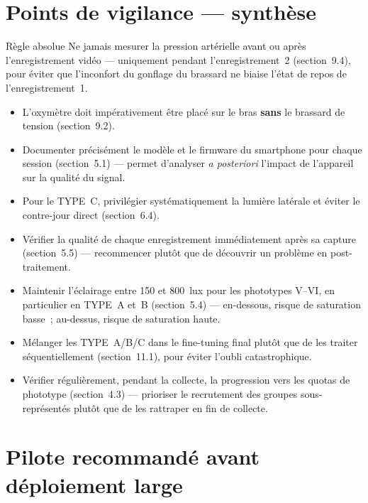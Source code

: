 \documentclass[11pt,a4paper]{article}
\begin{document}
\newpage
\section{Points de vigilance --- synth\`ese}

\begin{warnbox}{R\`egle absolue}
Ne jamais mesurer la pression art\'erielle avant ou apr\`es l'enregistrement
vid\'eo --- uniquement pendant l'enregistrement~2 (section~9.4), pour
\'eviter que l'inconfort du gonflage du brassard ne biaise l'\'etat de repos
de l'enregistrement~1.
\end{warnbox}

\begin{itemize}
\item L'oxym\`etre doit imp\'erativement \^etre plac\'e sur le bras
\textbf{sans} le brassard de tension (section~9.2).
\item Documenter pr\'ecis\'ement le mod\`ele et le firmware du smartphone
pour chaque session (section~5.1) --- permet d'analyser \emph{a posteriori}
l'impact de l'appareil sur la qualit\'e du signal.
\item Pour le TYPE~C, privil\'egier syst\'ematiquement la lumi\`ere
lat\'erale et \'eviter le contre-jour direct (section~6.4).
\item V\'erifier la qualit\'e de chaque enregistrement imm\'ediatement
apr\`es sa capture (section~5.5) --- recommencer plut\^ot que de
d\'ecouvrir un probl\`eme en post-traitement.
\item Maintenir l'\'eclairage entre 150 et 800~lux pour les phototypes
V--VI, en particulier en TYPE~A et~B (section~5.4) --- en-dessous, risque de
saturation basse~; au-dessus, risque de saturation haute.
\item M\'elanger les TYPE~A/B/C dans le fine-tuning final plut\^ot que de
les traiter s\'equentiellement (section~11.1), pour \'eviter l'oubli
catastrophique.
\item V\'erifier r\'eguli\`erement, pendant la collecte, la progression vers
les quotas de phototype (section~4.3) --- prioriser le recrutement des
groupes sous-repr\'esent\'es plut\^ot que de les rattraper en fin de
collecte.
\end{itemize}

\newpage

\section{Pilote recommand\'e avant d\'eploiement large}
\end{document}
